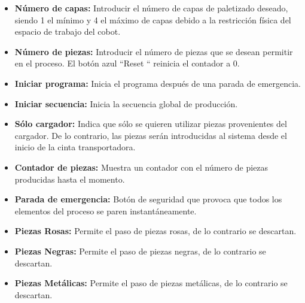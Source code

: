 \begin{itemize}
    \item \textbf{Número de capas:} Introducir el número de capas de paletizado deseado, siendo 1 el mínimo y 4 el máximo de capas debido a la restricción física del espacio de trabajo del cobot.
    
    \item \textbf{Número de piezas:} Introducir el número de piezas que se desean permitir en el proceso. El botón azul ``Reset `` reinicia el contador a 0.
    
    \item \textbf{Iniciar programa:} Inicia el programa después de una parada de emergencia.
    
    \item \textbf{Iniciar secuencia:} Inicia la secuencia global de producción.
    
    \item \textbf{Sólo cargador:} Indica que sólo se quieren utilizar piezas provenientes del cargador. De lo contrario, las piezas serán introducidas al sistema desde el inicio de la cinta transportadora.
    
    \item \textbf{Contador de piezas:} Muestra un contador con el número de piezas producidas hasta el momento.
    
    \item \textbf{Parada de emergencia:} Botón de seguridad que provoca que todos los elementos del proceso se paren instantáneamente.
    
    \item \textbf{Piezas Rosas:} Permite el paso de piezas rosas, de lo contrario se descartan.
    
    \item \textbf{Piezas Negras:} Permite el paso de piezas negras, de lo contrario se descartan.
    
    \item \textbf{Piezas Metálicas:} Permite el paso de piezas metálicas, de lo contrario se descartan.

\end{itemize}

